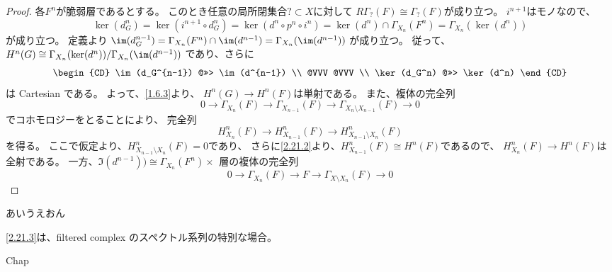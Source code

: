 \documentclass[uplatex,dvipdfmx]{jsarticle}
\begin{document}
\begin{proof}
  各\(F^n\)が脆弱層であるとする。
  このとき任意の局所閉集合\(?\subset X\)に対して
  \(R\Gamma_{?}(F)\cong \Gamma_{?}(F)\)が成り立つ。
  \(i^{n+1}\)はモノなので、
  \[
  \ker(d_G^n) = \ker(i^{n+1}\circ d_G^n) = \ker(d^n\circ p^n \circ i^n)
  = \ker(d^n)\cap \Gamma_{X_n}(F^n) = \Gamma_{X_n}(\ker(d^n))
  \]
  が成り立つ。
  定義より
  \(\im(d_G^{n-1}) = \Gamma_{X_n}(F^n)\cap \im(d^{n-1}) = \Gamma_{X_n}(\im(d^{n-1}))\)
  が成り立つ。
  従って、
  \(H^n(G) \cong \Gamma_{X_n}(\ker(d^n))/\Gamma_{X_n}(\im(d^{n-1}))\)
  であり、さらに
  \[
  \begin{CD}
    \im(d_G^{n-1}) @>>> \im(d^{n-1}) \\
    @VVV @VVV \\
    \ker(d_G^n) @>>> \ker(d^n)
  \end{CD}
  \]
  は Cartesian である。
  よって、\autoref{1.6.3}より、
  \(H^n(G) \to H^n(F)\)は単射である。
  また、複体の完全列
  \[
  0\to \Gamma_{X_n}(F) \to \Gamma_{X_{n-1}}(F) \to
  \Gamma_{X_n\setminus X_{n-1}}(F) \to 0
  \]
  でコホモロジーをとることにより、
  完全列
  \[
  H^n_{X_n}(F) \to H^n_{X_{n-1}}(F) \to H^n_{X_{n-1}\setminus X_n}(F)
  \]
  を得る。
  ここで仮定より、\(H^n_{X_{n-1}\setminus X_n}(F) = 0\)であり、
  さらに\ref{2.21.2}より、\(H^n_{X_{n-1}}(F)\cong H^n(F)\)であるので、
  \(H^n_{X_n}(F) \to H^n(F)\)は全射である。
  一方、\(\Im(d^{n-1})) \cong \Gamma_{X_n}(F^n)\times_{} \)
  層の複体の完全列
  \[
  0 \to \Gamma_{X_n}(F) \to F\to \Gamma_{X\setminus X_n}(F) \to 0
  \]

\end{proof}


あいうえおん

\begin{kansou*}
  \ref{2.21.3}は、filtered complex のスペクトル系列の特別な場合。
\end{kansou*}



\ifcsname Chap\endcsname\else
\printbibliography
\end{document}
